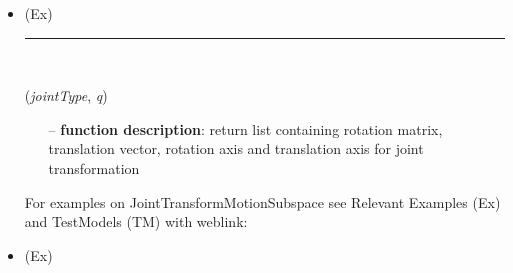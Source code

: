 \begin{itemize}[leftmargin=1.4cm]
\begin{itemize}[leftmargin=1.4cm]
\begin{itemize}[leftmargin=0.5cm]
\begin{itemize}[leftmargin=1.4cm]
\begin{itemize}[leftmargin=1.4cm]
\begin{itemize}[leftmargin=0.5cm]
\begin{itemize}[leftmargin=1.4cm]
\begin{itemize}[leftmargin=0.5cm]
\begin{itemize}[leftmargin=1.4cm]
\begin{itemize}[leftmargin=1.4cm]
\begin{itemize}[leftmargin=1.4cm]
\bi
 \item \footnotesize {} (Ex)
\ei

%
\noindent\rule{8cm}{0.75pt}\vspace{1pt} \\ 
\begin{flushleft}
\label{sec:kinematicTree:JointTransformMotionSubspace}
({\it jointType}, {\it q})
\end{flushleft}
\setlength{\itemindent}{0.7cm}
\begin{itemize}[leftmargin=0.7cm]
\item[--]
{\bf function description}: return list containing rotation matrix, translation vector, rotation axis and translation axis for joint transformation
\vspace{12pt}\end{itemize}
%
%
\noindent For examples on JointTransformMotionSubspace see Relevant Examples (Ex) and TestModels (TM) with weblink:
\bi
 \item \footnotesize {} (Ex)
\ei


\end{itemize}
\end{itemize}
\end{itemize}
\end{itemize}
\end{itemize}
\end{itemize}
\end{itemize}
\end{itemize}
\end{itemize}
\end{itemize}
\end{itemize}
